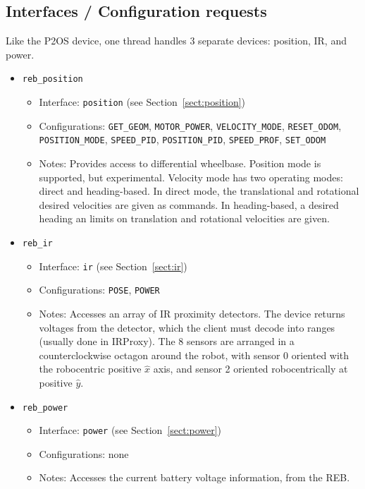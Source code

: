 \subsection*{Interfaces / Configuration requests}
Like the P2OS device, one thread handles 3 separate devices: position, IR, and power. 
\begin{itemize}
	\item \texttt{reb\_position}
	\begin{itemize}
		\item Interface: {\tt position} (see Section~\ref{sect:position})
		\item Configurations: {\tt GET\_GEOM}, {\tt MOTOR\_POWER}, 
			{\tt VELOCITY\_MODE}, {\tt RESET\_ODOM}, {\tt POSITION\_MODE},
			{\tt SPEED\_PID}, {\tt POSITION\_PID}, {\tt SPEED\_PROF},
			{\tt SET\_ODOM}
		\item Notes: Provides access to differential wheelbase.  Position mode is supported, but experimental.  Velocity mode has two operating modes: direct and heading-based.  In direct mode, the translational and rotational desired velocities are given as commands.  In heading-based, a desired heading an limits on translation and rotational velocities are given.
	\end{itemize}
	
	\item {\tt reb\_ir}
	
	\begin{itemize}
		\item Interface: {\tt ir} (see Section~\ref{sect:ir})
		\item Configurations: {\tt POSE}, {\tt POWER}
		\item Notes: Accesses an array of IR proximity detectors.  The device returns voltages from the detector, which the client must decode into ranges (usually done in IRProxy).  
		The 8 sensors are arranged in a counterclockwise  octagon around the robot, with sensor 0 oriented with the robocentric positive $\hat{x}$ axis, and sensor 2 oriented robocentrically at positive $\hat{y}$.
	\end{itemize}

	\item {\tt reb\_power}
	\begin{itemize}
		\item Interface: {\tt power} (see Section~\ref{sect:power})
		\item Configurations: none
		\item Notes: Accesses the current battery voltage information, from the REB.
	\end{itemize}
\end{itemize}

